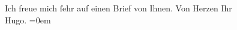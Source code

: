\begin{ledgroupsized}[t]{13cm}
           \pstart
           Ich freue mich ſehr auf einen Brief von Ihnen.\pend
           \pstart
           Von Herzen Ihr{\\[\baselineskip]}\spacefill\mbox{Hugo.}\pend
           \leftskip=0em{}
         
         \endnumbering{}\end{ledgroupsized}  \newcommand{\dateiname}{L01149}\newcommand{\titel}{Hugo von Hofmannsthal an Arthur Schnitzler, 18. 7. [1901]}\newcommand{\editorInnen}{ Martin Anton Müller und Gerd-Hermann Susen}
      